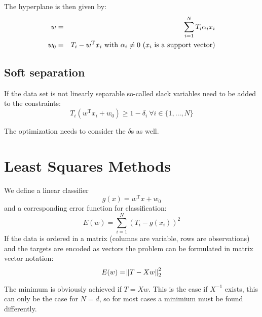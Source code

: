 The hyperplane is then given by:
\begin{eqnarray*}
    w &=& \sum_{i=1}^N T_i \alpha_i x_i \\
    w_0 &=& T_i - w^\text{T}x_i \text{ with } \alpha_i \neq 0\ (x_i \text{ is a support vector})
\end{eqnarray*}

\subsection{Soft separation}
If the data set is not linearly separable so-called slack variables need to be added to the constraints:
\begin{equation*}
    T_i (w^\text{T} x_i + w_0) \geq 1 - \delta_i\ \forall i \in \{1, \ldots, N\}
\end{equation*}

The optimization needs to consider the $\delta$s as well.

\section{Least Squares Methods}
We define a linear classifier
\begin{equation*}
    g(x) = w^\text{T} x + w_0
\end{equation*}
and a corresponding error function for classification:
\begin{equation*}
    E(w) = \sum_{i=1}^N {(T_i - g(x_i))}^2
\end{equation*}
If the data is ordered in a matrix (columns are variable, rows are observations) and the targets are encoded as vectors the problem can be formulated in matrix vector notation:
\begin{equation*}
    E(w) = \norm{T - X w }_2^2
\end{equation*}

The minimum is obviously achieved if $T = Xw$. This is the case if $X^{-1}$ exists, this can only be the case for $N=d$, so for most cases a minimium must be found differently.

